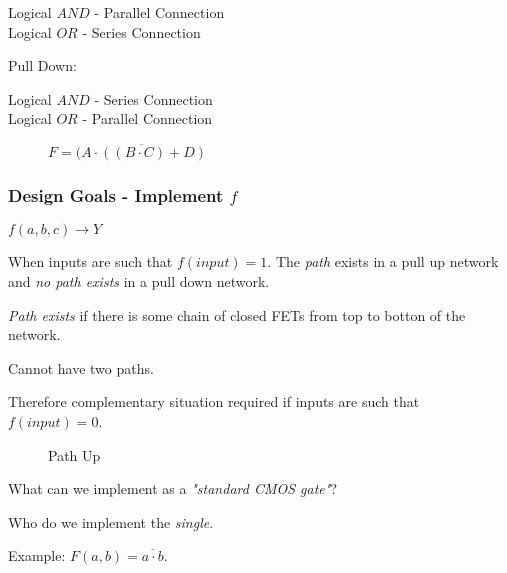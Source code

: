 \documentclass[a4paper,12pt]{article}
\begin{document}
Logical $AND$ - Parallel Connection \\
Logical $OR$  - Series Connection 

Pull Down:

Logical $AND$ - Series Connection \\
Logical $OR$  - Parallel Connection

\begin{figure}[tbtp]


\caption{$F = \overline{(A \cdot ((B \cdot C) + D)}$}

\end{figure}

\subsubsection*{Design Goals - Implement $f$}

$f(a, b, c) \to Y$

When inputs are such that $f(input) = 1$. The \emph{path} exists in a
pull up network and \emph{no path exists} in a pull down network.

\emph{Path exists} if there is some chain of closed FETs from top to
botton of the network.

Cannot have two paths.

\begin{figure}


\end{figure}

Therefore complementary situation required if inputs are such that
$f(input) = 0$.

\begin{figure}


\end{figure}

\begin{figure}



\caption{Path Up}

\end{figure}

What can we implement as a \emph{"standard CMOS gate"}?

Who do we implement the \emph{single}.

Example: $F(a, b) = \overline{a \cdot b}$.
\end{document}
